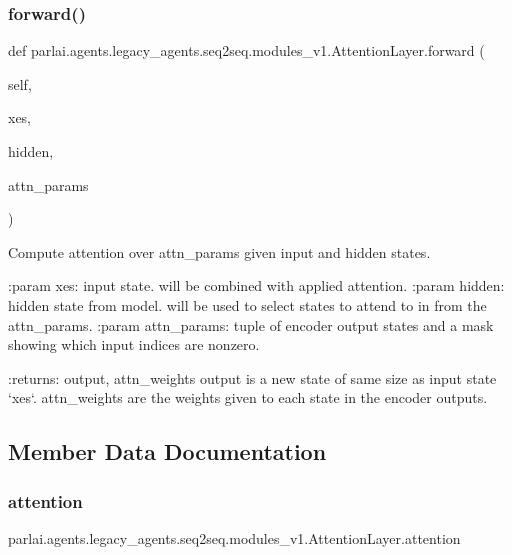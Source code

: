 \subsubsection{\texorpdfstring{forward()}{forward()}}
{\footnotesize\ttfamily def parlai.\+agents.\+legacy\+\_\+agents.\+seq2seq.\+modules\+\_\+v1.\+Attention\+Layer.\+forward (\begin{DoxyParamCaption}\item[{}]{self,  }\item[{}]{xes,  }\item[{}]{hidden,  }\item[{}]{attn\+\_\+params }\end{DoxyParamCaption})}

\begin{DoxyVerb}Compute attention over attn_params given input and hidden states.

:param xes:         input state. will be combined with applied
            attention.
:param hidden:      hidden state from model. will be used to select
            states to attend to in from the attn_params.
:param attn_params: tuple of encoder output states and a mask showing
            which input indices are nonzero.

:returns: output, attn_weights
  output is a new state of same size as input state `xes`.
  attn_weights are the weights given to each state in the
  encoder outputs.
\end{DoxyVerb}
 

\subsection{Member Data Documentation}
\mbox{\label{classparlai_1_1agents_1_1legacy__agents_1_1seq2seq_1_1modules__v1_1_1AttentionLayer_a6c95b5fa079109f57c305954f1f1465a}} 
\subsubsection{\texorpdfstring{attention}{attention}}
{\footnotesize\ttfamily parlai.\+agents.\+legacy\+\_\+agents.\+seq2seq.\+modules\+\_\+v1.\+Attention\+Layer.\+attention}

